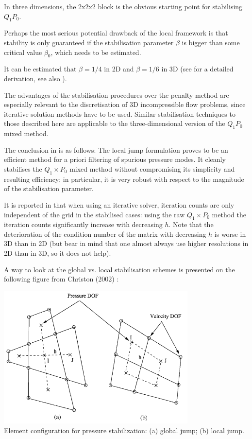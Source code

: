 In three dimensions, the 2x2x2 block is the obvious starting point for stabilising $Q_1P_0$.

Perhaps the most serious potential drawback of the local framework is that 
stability is only guaranteed if the stabilisation parameter $\beta$ is bigger than some 
critical value $\beta_0$, which needs to be estimated.

It can be estimated that $\beta=1/4$ in 2D and $\beta=1/6$ in 3D (see \cite[p636]{grsa} 
for a detailed derivation, see also \cite{vibo92}). 

The advantages of the stabilisation procedures over the penalty method 
are especially relevant to the discretisation of 3D incompressible flow problems, 
since iterative solution methods have to be used. 
Similar stabilisation techniques to those described here are applicable to  
the three-dimensional version of the $Q_1P_0$ mixed method.

The conclusion in \cite{sike90} is as follows:
The local jump formulation proves to be an efficient method for a priori filtering of  
spurious pressure modes. It cleanly stabilises the $Q_1\times P_0$ mixed method without compromising 
its simplicity and resulting efficiency; in particular, it is very robust with respect to the magnitude
of the stabilisation parameter. 

It is reported in \cite{grsa} that when using an iterative solver, iteration counts 
are only independent of the grid in the stabilised cases: using the raw $Q_1\times P_0$ method
the iteration counts significantly increase with decreasing $h$. Note that the deterioration
of the condition number of the matrix with decreasing $h$ is worse in 3D than in 2D (but
bear in mind that one almost always use higher resolutions in 2D than in 3D, so it does not help).




A way to look at the global vs. local stabilisation schemes is presented 
on the following figure from Christon (2002) \cite{chri02}:

\begin{center}
\includegraphics[width=10cm]{images/q1p0stab/chri02}\\
{\captionfont Element configuration for pressure stabilization: (a) global jump; (b) local jump.}
\end{center}

